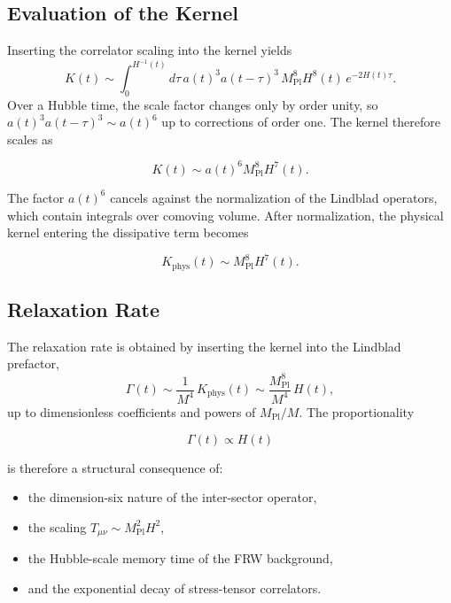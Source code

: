 \documentclass[11pt,a4paper]{article}
\begin{document}
\subsection{Evaluation of the Kernel}

Inserting the correlator scaling into the kernel yields
\begin{equation}
K(t)
    \sim \int_{0}^{H^{-1}(t)}
         d\tau\,
         a(t)^{3} a(t-\tau)^{3}\,
         M_{\mathrm{Pl}}^{8} H^{8}(t)\,
         e^{-2H(t)\tau}.
\end{equation}
Over a Hubble time, the scale factor changes only by order unity, so
\(a(t)^{3} a(t-\tau)^{3} \sim a(t)^{6}\) up to corrections of order one. The
kernel therefore scales as


\[
K(t)
    \sim a(t)^{6} M_{\mathrm{Pl}}^{8} H^{7}(t).
\]


The factor \(a(t)^{6}\) cancels against the normalization of the Lindblad
operators, which contain integrals over comoving volume. After normalization,
the physical kernel entering the dissipative term becomes


\[
K_{\mathrm{phys}}(t)
    \sim M_{\mathrm{Pl}}^{8} H^{7}(t).
\]



\subsection{Relaxation Rate}

The relaxation rate is obtained by inserting the kernel into the Lindblad
prefactor,
\begin{equation}
\Gamma(t)
    \sim \frac{1}{M^{4}}\, K_{\mathrm{phys}}(t)
    \sim \frac{M_{\mathrm{Pl}}^{8}}{M^{4}}\, H(t),
\end{equation}
up to dimensionless coefficients and powers of \(M_{\mathrm{Pl}}/M\). The
proportionality


\[
\Gamma(t) \propto H(t)
\]


is therefore a structural consequence of:

\begin{itemize}
    \item the dimension-six nature of the inter-sector operator,
    \item the scaling \(T_{\mu\nu} \sim M_{\mathrm{Pl}}^{2} H^{2}\),
    \item the Hubble-scale memory time of the FRW background,
    \item and the exponential decay of stress-tensor correlators.
\end{itemize}
\end{document}
